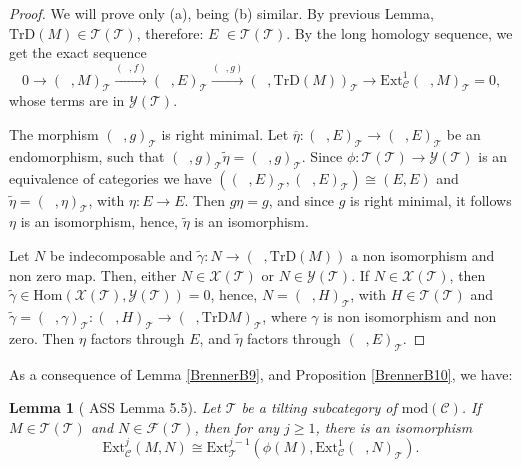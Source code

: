 \documentclass{amsart}
\theoremstyle{plain}
\newtheorem{lemma}{Lemma}
\numberwithin{equation}{section}
\begin{document}
\begin{proof}
We will prove only (a), being (b) similar. By previous Lemma, $\mathrm{TrD}(M)\in \mathscr{T}(\mathcal{T})$, therefore: $E$ $\in \mathscr{T}(\mathcal{T})$. By the long homology sequence, we get the exact sequence
\begin{equation}
0\rightarrow (\;\;,M)_{\mathcal{T}}\xrightarrow{(\;\;,f)}(\;\;,E)_{\mathcal{T}}\xrightarrow{(\;\;,g)}(\;\;,\mathrm{TrD}(M))_{\mathcal{T}}\rightarrow
\mathrm{Ext}^1_\mathcal{C}(\;\;,M)_{\mathcal{T}}=0\text{,}
\end{equation}whose terms are in $\mathscr{Y}(\mathcal{T})$.

The morphism $(\;\;,g)_{\mathcal{T}}$ is right minimal. Let $\overline{\eta }:(\;\;,E)_{\mathcal{T}}\rightarrow (\;\;,E)_{\mathcal{T}}$ be an
endomorphism, such that $(\;\;,g)_{\mathcal{T}}\tilde{\eta}=(\;\;,g)_{\mathcal{T}}$. Since $\phi:\mathscr{T}(\mathcal{T})\rightarrow \mathscr{Y}(\mathcal{T})$ is an equivalence of categories we have $((\;\;,E)_{\mathcal{T}},(\;\;,E)_{\mathcal{T}})\cong (E,E)$ and $\tilde{\eta}=(\;\;,\eta )_{\mathcal{T}}$, with $\eta :E\rightarrow E$. Then $g\eta =g$, and since $g$
is right minimal, it follows $\eta $ is an isomorphism, hence, $\tilde{\eta}$
is an isomorphism.

Let $N$ be indecomposable and $\tilde{\gamma}:N\rightarrow (\;\;,\mathrm{TrD}(M))$ a non isomorphism and non zero map. Then, either $N\in \mathscr{X}(\mathcal{T})$ or $N\in \mathscr{Y}(\mathcal{T})$. If $N\in \mathscr X(\mathcal{T})$, then $\tilde{\gamma}\in \mathrm{Hom}(\mathscr X(\mathcal{T}),\mathscr Y(\mathcal{T}))=0$, hence, $N=(\;\;,H)_\mathcal{T}$, with $H\in \mathscr T(\mathcal{T})$ and $\tilde{\gamma}=(\;\;,\gamma )_\mathcal{T}:(\;\;,H)_\mathcal{T}\rightarrow (\;\;,\mathrm{TrD}M)_\mathcal{T}$, where $\gamma $ is non isomorphism and non zero. Then $\eta $ factors through $E$,
and $\tilde{\eta}$ factors through $(\;\;,E)_\mathcal{T}$.
\end{proof}

As a consequence of Lemma \ref{BrennerB9}, and Proposition \ref{BrennerB10},
we have:

\begin{lemma}[ ASS Lemma 5.5]
Let $\mathcal{T}$ be a tilting subcategory of $\mathrm{mod}(\mathcal{C})$.
If $M\in \mathscr T(\mathcal{T})$ and $N\in \mathscr F(\mathcal{T})$, then
for any $j\geq 1$, there is an isomorphism
\begin{equation*}
\mathrm{Ext}_{\mathcal{C}}^{j}(M,N)\cong \mathrm{Ext}_{\mathcal{T}}^{j-1}(\phi (M),\mathrm{Ext}^{1}_{\mathcal{C}}(\;\;,N)_\mathcal{T})\text{.}
\end{equation*}
\end{lemma}
\end{document}
